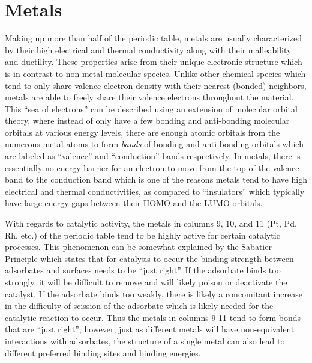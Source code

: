 \section{Metals}
Making up more than half of the periodic table, metals are usually
characterized by their high electrical and thermal conductivity along with
their malleability and ductility. These properties arise from their unique
electronic structure which is in contrast to non-metal molecular species.
Unlike other chemical species which tend to only share valence electron density
with their nearest (bonded) neighbors, metals are able to freely share their
valence electrons throughout the material.  This ``sea of electrons'' can be
described using an extension of molecular orbital theory, where instead of only
have a few bonding and anti-bonding molecular orbitals at various energy
levels, there are enough atomic orbitals from the numerous metal atoms to form
{\em bands} of bonding and anti-bonding orbitals which are labeled as
``valence'' and ``conduction'' bands respectively. In metals, there is
essentially no energy barrier for an electron to move from the top of the
valence band to the conduction band which is one of the reasons metals tend to
have high electrical and thermal conductivities, as compared to ``insulators''
which typically have large energy gaps between their HOMO and the LUMO
orbitals.


With regards to catalytic activity, the metals in columns 9, 10, and 11 (Pt,
Pd, Rh, etc.) of the periodic table tend to be highly active for certain
catalytic processes. This phenomenon can be somewhat explained by the Sabatier
Principle which states that for catalysis to occur the binding strength between
adsorbates and surfaces needs to be ``just right''. If the adsorbate binds too
strongly, it will be difficult to remove and will likely poison or deactivate
the catalyst. If the adsorbate binds too weakly, there is likely a concomitant
increase in the difficulty of scission of the adsorbate which is likely needed
for the catalytic reaction to occur. Thus the metals in columns 9-11 tend to
form bonds that are ``just right''; however, just as different metals will have
non-equivalent interactions with adsorbates, the structure of a single metal
can also lead to different preferred binding sites and binding energies.


